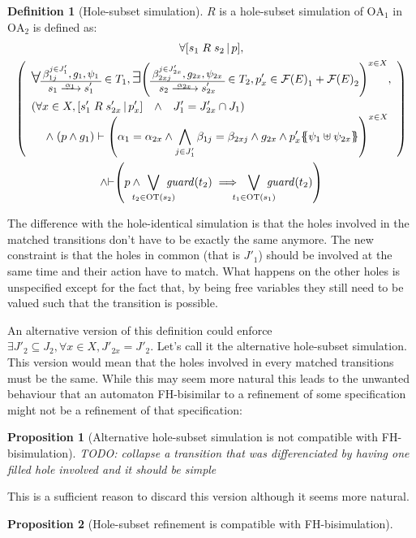 \documentclass{article}
\theoremstyle{plain}
\newtheorem{prop}{Proposition}
\theoremstyle{definition}
\newtheorem{defi}{Definition}
\newcommand\nmm[1]{\(\displaystyle #1\)}
\newcommand\mpar[1]{{\left(#1\right)}}
\newcommand\mbrk[1]{{\left[#1\right]}}
\newcommand\mbrc[1]{{\left\{#1\right\}}}
\newcommand\psubst[1]{\mbrc{\!\!\mbrc{#1}\!\!}}
\newcommand\midbar{\,\middle|\,}
\newcommand\prel[4]{\mbrk{#2\mathrel{#1}#3\midbar #4}}
\newcommand\subbox[1]{{\makebox[.5\width]{\(\scriptstyle #1\)}}}
\newcommand\bigsymb[2][\Large]{\text{#1\nmm{#2}}}
\newcommand\nwedge{\DOTSB\;{\wedge}\;}
\newcommand\qwedge{\DOTSB\quad{\wedge}\quad}
\newcommand\sat{{\vdash}}
\newcommand\fformulas[1]{{\mathcal{F}\mpar{#1}}}
\newcommand\OT[6]{\text{\small\(%
	\setlength\arraycolsep{2pt}\everymath{\displaystyle}%
	\begin{array}{c}%
	#4,#5,#6 \\\hline
	#1\xrightarrow{\raisebox{-1.5pt}[.8\height][0pt]{\makebox[1.4\width]{\(\scriptstyle #3\)}}}#2
	\end{array}\)}}
\newcommand\OTx[4]{\OT{s_{#1}}{s'_{#1 #2}}{\alpha_{#1 #2}}{\beta_{#3 j}^{j \in J'_{#4}}}{g_{#1 #2}}{\psi_{#1 #2}}}
\begin{document}
\begin{defi}[Hole-subset simulation]
\(R\) is a hole-subset simulation of \(\mathrm{OA}_1\) in \(\mathrm{OA}_2\) is defined as:
\begin{multline*}
	\forall \prel{R}{s_1}{s_2}{p}, \\
	\mpar{\everymath{\displaystyle}\begin{array}{l}
		\bigsymb{\forall} \OTx{1}{}{1}{1} \in T_1, \bigsymb{\exists} \mpar{\OTx{2}{x}{2x}{2x} \in T_2, p'_x \in \fformulas{E}_1 + \fformulas{E}_2}^{x \in X}, \\[12pt]
		\mpar{\forall x \in X, \prel{R}{s'_1}{s'_{2x}}{p'_x} \qwedge J'_1 = J'_{2x} \cap J_1} \\
		\quad \nwedge \mpar{p \wedge g_1} \vdash \mpar{\alpha_1 = \alpha_{2x} \wedge \bigwedge_{j \in J'_1} \beta_{1j} = \beta_{2xj} \wedge g_{2x} \wedge p'_x\psubst{\psi_1 \uplus \psi_{2x}}}^{x \in X} \\[12pt]
	\end{array}} \\
	\wedge \sat\mpar{p \wedge \bigvee_\subbox{t_2 \in \mathrm{OT}\mpar{s_2}} \mathit{guard}\mpar{t_2} \implies \bigvee_\subbox{t_1 \in \mathrm{OT}\mpar{s_1}} \mathit{guard}\mpar{t_2}}
\end{multline*}
\end{defi}
The difference with the hole-identical simulation is that the holes involved in the matched transitions don't have to be exactly the same anymore.
The new constraint is that the holes in common (that is \(J'_1\)) should be involved at the same time and their action have to match.
What happens on the other holes is unspecified except for the fact that, by being free variables they still need to be valued such that the transition is possible.

An alternative version of this definition could enforce \(\exists J'_2 \subseteq J_2, \forall x \in X, J'_{2x} = J'_2\).
Let's call it the alternative hole-subset simulation.
This version would mean that the holes involved in every matched transitions must be the same.
While this may seem more natural this leads to the unwanted behaviour that an automaton FH-bisimilar to a refinement of some specification might not be a refinement of that specification:
\begin{prop}[Alternative hole-subset simulation is not compatible with FH-bisimulation]
TODO: collapse a transition that was differenciated by having one filled hole involved and it should be simple
\end{prop}
This is a sufficient reason to discard this version although it seems more natural.
\begin{prop}[Hole-subset refinement is compatible with FH-bisimulation]
\end{prop}
\end{document}
